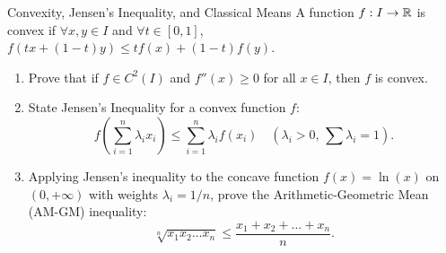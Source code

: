 \begin{exercise}{Convexity, Jensen's Inequality, and Classical Means}
A function $f: I \to \mathbb{R}$ is convex if $\forall x, y \in I$ and $\forall t \in [0, 1]$, $f(tx + (1-t)y) \le t f(x) + (1-t)f(y)$.
\begin{enumerate}[leftmargin=1.5em,itemsep=2pt]
  \item Prove that if $f \in C^2(I)$ and $f''(x) \ge 0$ for all $x \in I$, then $f$ is convex.
  \item State Jensen's Inequality for a convex function $f$:
  \[
  f\left(\sum_{i=1}^n \lambda_i x_i\right) \le \sum_{i=1}^n \lambda_i f(x_i) \quad \left(\lambda_i > 0,\, \sum \lambda_i = 1\right).
  \]
  \item Applying Jensen's inequality to the concave function $f(x) = \ln(x)$ on $(0, +\infty)$ with weights $\lambda_i = 1/n$, prove the Arithmetic-Geometric Mean (AM-GM) inequality:
  \[
  \sqrt[n]{x_1 x_2 \dots x_n} \le \frac{x_1 + x_2 + \dots + x_n}{n}.
  \]
\end{enumerate}
\end{exercise}

\begin{tabletworkspace}[5.0cm]
\end{tabletworkspace}

